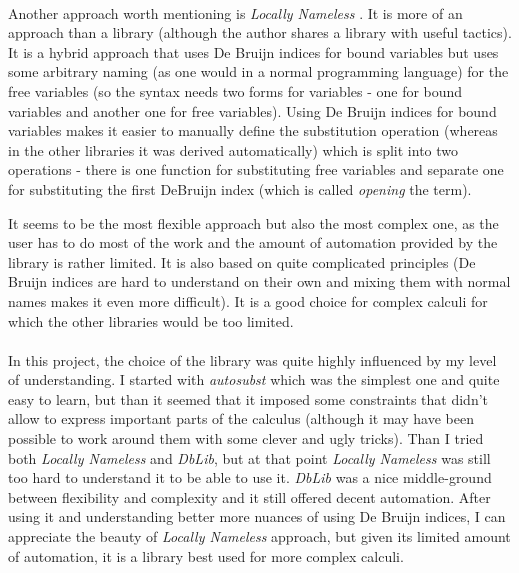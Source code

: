 \documentclass[runningheads]{article}
\begin{document}
\paragraph{}

Another approach worth mentioning is \textit{Locally Nameless} \cite{locallynameless}. It is more of an approach than a library (although the author shares a library with useful tactics). It is a hybrid approach that uses De Bruijn indices for bound variables but uses some arbitrary naming (as one would in a normal programming language) for the free variables (so the syntax needs two forms for variables - one for bound variables and another one for free variables). Using De Bruijn indices for bound variables makes it easier to manually define the substitution operation (whereas in the other libraries it was derived automatically) which is split into two operations - there is one function for substituting free variables and separate one for substituting the first DeBruijn index (which is called \textit{opening} the term). 

It seems to be the most flexible approach but also the most complex one, as the user has to do most of the work and the amount of automation provided by the library is rather limited. It is also based on quite complicated principles (De Bruijn indices are hard to understand on their own and mixing them with normal names makes it even more difficult). It is a good choice for complex calculi for which the other libraries would be too limited.

\paragraph{}

In this project, the choice of the library was quite highly influenced by my level of understanding. I started with \textit{autosubst} which was the simplest one and quite easy to learn, but than it seemed that it imposed some constraints that didn't allow to express important parts of the calculus (although it may have been possible to work around them with some clever and ugly tricks). Than I tried both \textit{Locally Nameless} and \textit{DbLib}, but at that point \textit{Locally Nameless} was still too hard to understand it to be able to use it. \textit{DbLib} was a nice middle-ground between flexibility and complexity and it still offered decent automation. After using it and understanding better more nuances of using De Bruijn indices, I can appreciate the beauty of \textit{Locally Nameless} approach, but given its limited amount of automation, it is a library best used for more complex calculi.
\end{document}

